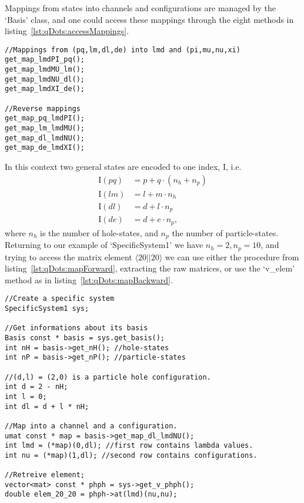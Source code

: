 Mappings from states into channels and configurations are managed by the `Basis' class, and one could access these mappings through the eight methods  in listing~\ref{lst:qDots:accessMappings}.
\begin{lstlisting}[float,label={lst:qDots:accessMappings},caption={There are eight different mappings possible to access through the basis object.}]
//Mappings from (pq,lm,dl,de) into lmd and (pi,mu,nu,xi)
get_map_lmdPI_pq();
get_map_lmdMU_lm();
get_map_lmdNU_dl();
get_map_lmdXI_de();

//Reverse mappings 
get_map_pq_lmdPI();
get_map_lm_lmdMU();
get_map_dl_lmdNU();
get_map_de_lmdXI();
\end{lstlisting}
In this context two general states are encoded to one index, $\mathrm{I}$, i.e.
\begin{equation}
\begin{split}
\mathrm{I}(pq) &= p + q \cdot (n_h + n_p) \\
\mathrm{I}(lm) &= l + m \cdot n_h \\
\mathrm{I}(dl) &= d + l \cdot n_p \\
\mathrm{I}(de) &= d + e \cdot n_p,
\end{split}
\end{equation}
where $n_h$ is the number of hole-states, and $n_p$ the number of particle-states.
Returning to our example of `SpecificSystem1' we have $n_h=2, n_p=10$, and trying to access the matrix element $\langle 20||20 \rangle$ we can use either the procedure from listing~\ref{lst:qDots:mapForward}, extracting the raw matrices, or use the `v\_elem' method as in listing~\ref{lst:qDots:mapBackward}.
\begin{lstlisting}[float,label={lst:qDots:mapForward},caption={We try to access the element $\langle 20||20 \rangle$ by mapping the $|20\rangle$ particle-hole state into a channel and a configuration, $|\nu\rangle_{\lambda}$.},name={lst:qDots:map}]
//Create a specific system
SpecificSystem1 sys;

//Get informations about its basis
Basis const * basis = sys.get_basis();
int nH = basis->get_nH(); //hole-states
int nP = basis->get_nP(); //particle-states

//(d,l) = (2,0) is a particle hole configuration.
int d = 2 - nH;
int l = 0;
int dl = d + l * nH;

//Map into a channel and a configuration.
umat const * map = basis->get_map_dl_lmdNU();
int lmd = (*map)(0,dl); //first row contains lambda values.
int nu = (*map)(1,dl); //second row contains configurations.

//Retreive element;
vector<mat> const * phph = sys->get_v_phph();
double elem_20_20 = phph->at(lmd)(nu,nu);
\end{lstlisting}
